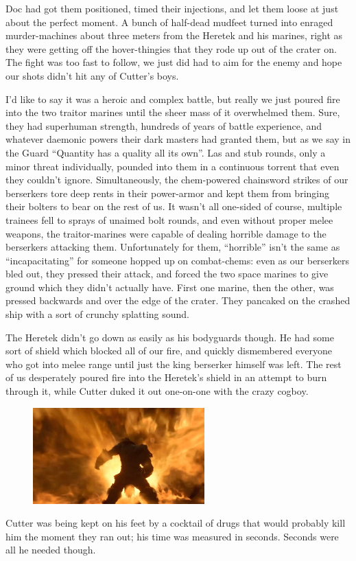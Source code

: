 Doc had got them positioned, timed their injections, and let them loose at just about the perfect moment. 
A bunch of half-dead mudfeet turned into enraged murder-machines about three meters from the Heretek and his marines, right as they were getting off the hover-thingies that they rode up out of the crater on. 
The fight was too fast to follow, we just did had to aim for the enemy and hope our shots didn’t hit any of Cutter’s boys.

I’d like to say it was a heroic and complex battle, but really we just poured fire into the two traitor marines until the sheer mass of it overwhelmed them. 
Sure, they had superhuman strength, hundreds of years of battle experience, and whatever daemonic powers their dark masters had granted them, but as we say in the Guard “Quantity has a quality all its own”. 
Las and stub rounds, only a minor threat individually, pounded into them in a continuous torrent that even they couldn’t ignore. 
Simultaneously, the chem-powered chainsword strikes of our berserkers tore deep rents in their power-armor and kept them from bringing their bolters to bear on the rest of us. 
It wasn’t all one-sided of course, multiple trainees fell to sprays of unaimed bolt rounds, and even without proper melee weapons, the traitor-marines were capable of dealing horrible damage to the berserkers attacking them. 
Unfortunately for them, “horrible” isn’t the same as “incapacitating” for someone hopped up on combat-chems: 
even as our berserkers bled out, they pressed their attack, and forced the two space marines to give ground which they didn’t actually have. 
First one marine, then the other, was pressed backwards and over the edge of the crater. 
They pancaked on the crashed ship with a sort of crunchy splatting sound.

The Heretek didn’t go down as easily as his bodyguards though. 
He had some sort of shield which blocked all of our fire, and quickly dismembered everyone who got into melee range until just the king berserker himself was left. 
The rest of us desperately poured fire into the Heretek’s shield in an attempt to burn through it, while Cutter duked it out one-on-one with the crazy cogboy.

\begin{figure}
	\begin{center}
		\includegraphics[width=\figwidth]{pics/8/57.png}
	\end{center}
\end{figure}
Cutter was being kept on his feet by a cocktail of drugs that would probably kill him the moment they ran out; 
his time was measured in seconds. 
Seconds were all he needed though.

